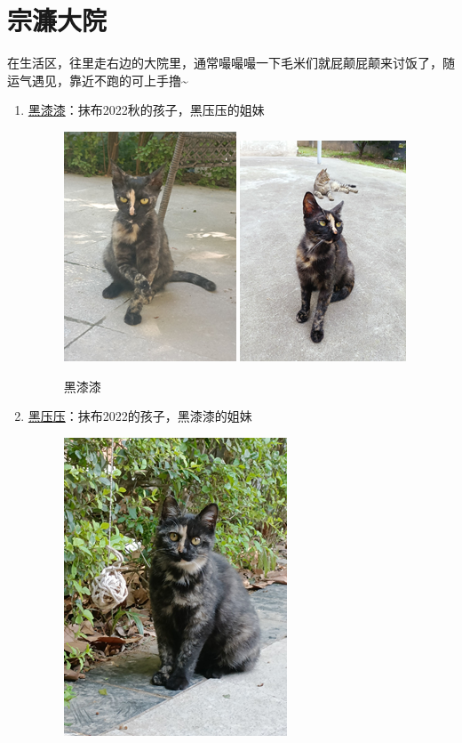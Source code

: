 \documentclass[zihao=-4,fontset=none]{Beautybook-CN}
\begin{document}
\section{宗濂大院}
在生活区，往里走右边的大院里，通常嘬嘬嘬一下毛米们就屁颠屁颠来讨饭了，随运气遇见，靠近不跑的可上手撸\textasciitilde{}
\begin{enumerate}
    \item \hyperref[img12]{黑漆漆}：抹布2022秋的孩子，黑压压的姐妹
    \begin{figure}[htbp]
            \centering
            \includegraphics[width=0.4\linewidth]{media/cimage1.png}
        \qquad
            \includegraphics[width=0.4\linewidth]{media/cimage2.png}
            \caption{黑漆漆}
            \label{img12}
    \end{figure}
    \item \hyperref[img34]{黑压压}：抹布2022的孩子，黑漆漆的姐妹
    \begin{figure}[htbp]
            \centering
            \includegraphics[width=0.4\linewidth]{media/cimage3.png}

\end{figure}
\end{enumerate}
\end{document}
